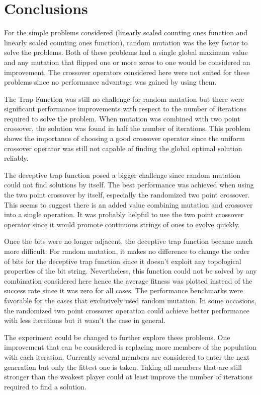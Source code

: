 \documentclass[10pt]{article}
\begin{document}
\section{Conclusions}

For the simple problems considered (linearly scaled counting ones function and linearly scaled counting ones function), random mutation was the key factor to solve the problems. Both of these problems had a single global maximum value and any mutation that flipped one or more zeros to one would be considered an improvement. The crossover operators considered here were not suited for these problems since no performance advantage was gained by using them.

The Trap Function was still no challenge for random mutation but there were significant performance improvements with respect to the number of iterations required to solve the problem. When mutation was combined with two point crossover, the solution was found in half the number of iterations. This problem shows the importance of choosing a good crossover operator since the uniform crossover operator was still not capable of finding the global optimal solution reliably.

The deceptive trap function posed a bigger challenge since random mutation could not find solutions by itself. The best performance was achieved when using the two point crossover by itself, especially the randomized two point crossover. This seems to suggest there is an added value combining mutation and crossover into a single operation. It was probably helpful to use the two point crossover operator since it would promote continuous strings of ones to evolve quickly.

Once the bits were no longer adjacent, the deceptive trap function became much more difficult. For random mutation, it makes no difference to change the order of bits for the deceptive trap function since it doesn't exploit any topological properties of the bit string. Nevertheless, this function could not be solved by any combination considered here hence the average fitness was plotted instead of the success rate since it was zero for all cases. The performance benchmarks were favorable for the cases that exclusively used random mutation. In some occasions, the randomized two point crossover operation could achieve better performance with less iterations but it wasn't the case in general.

The experiment could be changed to further explore thees problems. One improvement that can be considered is replacing more members of the population with each iteration. Currently several members are considered to enter the next generation but only the fittest one is taken. Taking all members that are still stronger than the weakest player could at least improve the number of iterations required to find a solution. 
\end{document}
